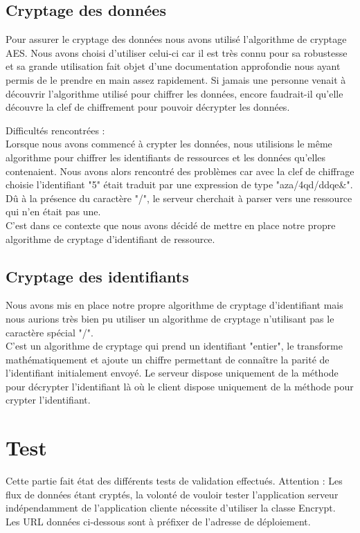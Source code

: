 \subsection{Cryptage des données}
Pour assurer le cryptage des données nous avons utilisé l'algorithme de cryptage AES. Nous avons choisi d'utiliser celui-ci car il est très connu pour sa robustesse et sa grande utilisation fait objet d'une documentation approfondie nous ayant permis de le prendre en main assez rapidement.
Si jamais une personne venait à découvrir l'algorithme utilisé pour chiffrer les données, encore faudrait-il qu'elle découvre la clef de chiffrement pour pouvoir décrypter les données.

Difficultés rencontrées : \\
Lorsque nous avons commencé à crypter les données, nous utilisions le même algorithme pour chiffrer les identifiants de ressources et les données qu'elles contenaient.
Nous avons alors rencontré des problèmes car avec la clef de chiffrage choisie l'identifiant "5" était traduit par une expression de type "aza/4qd/ddqe\&".
Dû à la présence du caractère "/", le serveur cherchait à parser vers une ressource qui n'en était pas une.\\
C'est dans ce contexte que nous avons décidé de mettre en place notre propre algorithme de cryptage d'identifiant de ressource.

\subsection{Cryptage des identifiants}

Nous avons mis en place notre propre algorithme de cryptage d'identifiant mais nous aurions très bien pu utiliser un algorithme de cryptage n'utilisant pas le caractère spécial "/".\\
C'est un algorithme de cryptage qui prend un identifiant "entier", le transforme mathématiquement et ajoute un chiffre permettant de connaître la parité de l'identifiant initialement envoyé.
Le serveur dispose uniquement de la méthode pour décrypter l'identifiant là où le client dispose uniquement de la méthode pour crypter l'identifiant.

\newpage
\section{Test}

Cette partie fait état des différents tests de validation effectués.
Attention : Les flux de données étant cryptés, la volonté de vouloir tester l'application serveur indépendamment de l'application cliente nécessite d'utiliser la classe Encrypt.\\
Les URL données ci-dessous sont à préfixer de l'adresse de déploiement.

